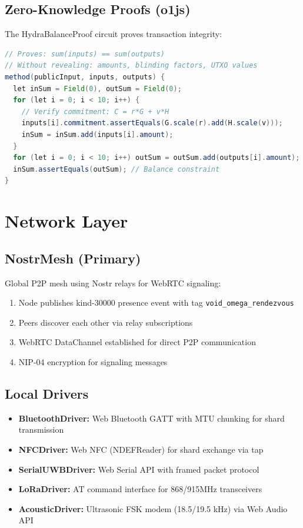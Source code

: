 \documentclass[11pt,a4paper]{article}
\begin{document}
\subsection{Zero-Knowledge Proofs (o1js)}
The HydraBalanceProof circuit proves transaction integrity:
\begin{lstlisting}[language=Java, caption=ZK Circuit Constraints]
// Proves: sum(inputs) == sum(outputs)
// Without revealing: amounts, blinding factors, UTXO values
method(publicInput, inputs, outputs) {
  let inSum = Field(0), outSum = Field(0);
  for (let i = 0; i < 10; i++) {
    // Verify commitment: C = r*G + v*H
    inputs[i].commitment.assertEquals(G.scale(r).add(H.scale(v)));
    inSum = inSum.add(inputs[i].amount);
  }
  for (let i = 0; i < 10; i++) outSum = outSum.add(outputs[i].amount);
  inSum.assertEquals(outSum); // Balance constraint
}
\end{lstlisting}

\section{Network Layer}

\subsection{NostrMesh (Primary)}
Global P2P mesh using Nostr relays for WebRTC signaling:
\begin{enumerate}[nosep]
  \item Node publishes kind-30000 presence event with tag \texttt{void\_omega\_rendezvous}
  \item Peers discover each other via relay subscriptions
  \item WebRTC DataChannel established for direct P2P communication
  \item NIP-04 encryption for signaling messages
\end{enumerate}

\subsection{Local Drivers}
\begin{itemize}[nosep]
  \item \textbf{BluetoothDriver:} Web Bluetooth GATT with MTU chunking for shard transmission
  \item \textbf{NFCDriver:} Web NFC (NDEFReader) for shard exchange via tap
  \item \textbf{SerialUWBDriver:} Web Serial API with framed packet protocol
  \item \textbf{LoRaDriver:} AT command interface for 868/915MHz transceivers
  \item \textbf{AcousticDriver:} Ultrasonic FSK modem (18.5/19.5 kHz) via Web Audio API
\end{itemize}
\end{document}
